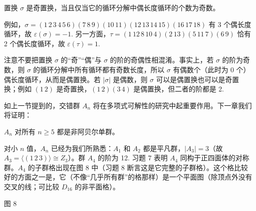 \begin{proposition}\label{pro:3.25}
置换 \(\sigma\) 是奇置换，当且仅当它的循环分解中偶长度循环的个数为奇数。
\end{proposition}

例如，\(\sigma = (1\,2\,3\,4\,5\,6)(7\,8\,9)(10\,11)(12\,13\,14\,15)(16\,17\,18)\) 有 3 个偶长度循环，故 \(\varepsilon(\sigma) = -1\). 另一方面，\(\tau = (1\,12\,8\,10\,4)(2\,13)(5\,11\,7)(6\,9)\) 恰有 2 个偶长度循环，故 \(\varepsilon(\tau) = 1\).

注意不要把置换 \(\sigma\) 的“奇”“偶”与 \(\sigma\) 的阶的奇偶性相混淆。事实上，若 \(\sigma\) 的阶为奇数，则 \(\sigma\) 的循环分解中所有循环都有奇数长度，所以 \(\sigma\) 有偶数个（此时为 0 个）偶长度循环，从而是偶置换。若 \(|\sigma|\) 是偶数，则 \(\sigma\) 可以是偶置换也可以是奇置换；例如 \((1\,2)\) 是奇置换，\((1\,2)(3\,4)\) 是偶置换，但二者的阶都是 2.

如上一节提到的，交错群 \(A_n\) 将在多项式可解性的研究中起重要作用。下一章我们将证明：

\begin{center}
\(A_n\) 对所有 \(n \geq 5\) 都是非阿贝尔单群。
\end{center}

对小 \(n\) 值，\(A_n\) 已经为我们所熟悉：\(A_1\) 和 \(A_2\) 都是平凡群，\(|A_3| = 3\)（故 \(A_3 = \langle (1\,2\,3) \rangle \cong Z_3\)）。群 \(A_4\) 的阶为 12. 习题 7 表明 \(A_4\) 同构于正四面体的对称群。\(A_4\) 的子群格出现在图 8 中（习题 8 断言这是它完整的子群格）。这个格比较好的方面之一是，它（不像“几乎所有群”的格那样）是一个平面图（除顶点外没有交叉的线；可比较 \(D_{16}\) 的非平面格）。

\begin{center}

图 8
\end{center}


